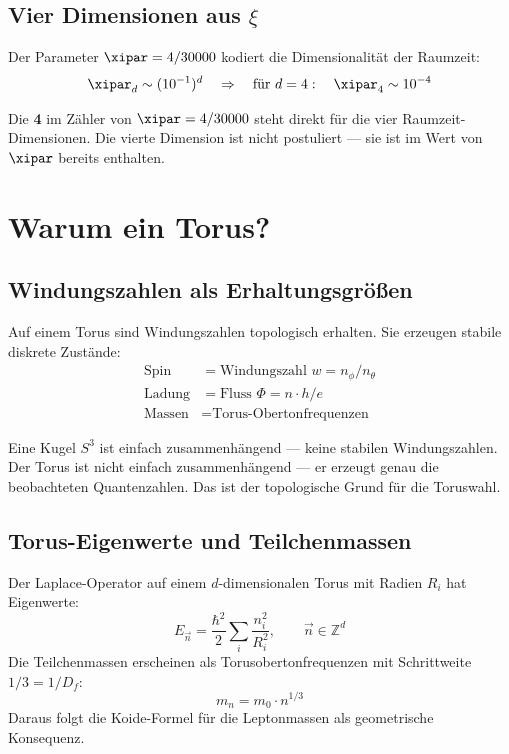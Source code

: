 \subsection{Vier Dimensionen aus \texorpdfstring{$\xi$}{xi}}

Der Parameter $\xipar = 4/30000$ kodiert die Dimensionalität der Raumzeit:
\begin{equation}
	\xipar_d \sim (10^{-1})^d \quad \Rightarrow \quad \text{für } d=4: \quad \xipar_4 \sim 10^{-4}
\end{equation}

\begin{keyresult}
Die \textbf{4} im Zähler von $\xipar = 4/30000$ steht direkt für die vier Raumzeit-Dimensionen. Die vierte Dimension ist nicht postuliert — sie ist im Wert von $\xipar$ bereits enthalten.
\end{keyresult}

\section{Warum ein Torus?}

\subsection{Windungszahlen als Erhaltungsgrößen}

Auf einem Torus sind Windungszahlen topologisch erhalten. Sie erzeugen stabile diskrete Zustände:
\begin{align}
	\text{Spin} &= \text{Windungszahl } w = n_\phi / n_\theta \\
	\text{Ladung} &= \text{Fluss } \Phi = n \cdot h/e \\
	\text{Massen} &= \text{Torus-Obertonfrequenzen}
\end{align}

\begin{keypoint}
Eine Kugel $S^3$ ist einfach zusammenhängend — keine stabilen Windungszahlen. Der Torus ist nicht einfach zusammenhängend — er erzeugt genau die beobachteten Quantenzahlen. Das ist der topologische Grund für die Toruswahl.
\end{keypoint}

\subsection{Torus-Eigenwerte und Teilchenmassen}

Der Laplace-Operator auf einem $d$-dimensionalen Torus mit Radien $R_i$ hat Eigenwerte:
\begin{equation}
	E_{\vec{n}} = \frac{\hbar^2}{2} \sum_i \frac{n_i^2}{R_i^2}, \qquad \vec{n} \in \mathbb{Z}^d
\end{equation}
Die Teilchenmassen erscheinen als Torusobertonfrequenzen mit Schrittweite $1/3 = 1/D_f$:
\begin{equation}
	m_n = m_0 \cdot n^{1/3}
\end{equation}
Daraus folgt die Koide-Formel für die Leptonmassen als geometrische Konsequenz.

